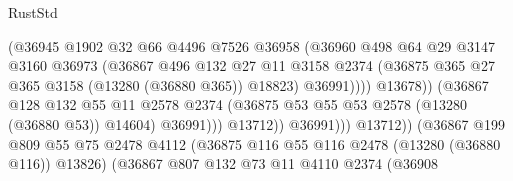\begin{lexlean}{RustStd}
\begin{coremodule}
                                          (@36945
                                            @1902
                                            @32
                                            @66
                                            @4496
                                            @7526
                                            @36958
                                            (@36960
                                              @498
                                              @64
                                              @29
                                              @3147
                                              @3160
                                              @36973
                                              (@36867
                                                @496
                                                @132
                                                @27
                                                @11
                                                @3158
                                                @2374
                                                (@36875
                                                  @365
                                                  @27
                                                  @365
                                                  @3158
                                                  (@13280 (@36880 @365))
                                                  @18823)
                                                @36991))))
                                        @13678))
                                    (@36867
                                      @128
                                      @132
                                      @55
                                      @11
                                      @2578
                                      @2374
                                      (@36875 @53 @55 @53 @2578 (@13280 (@36880 @53)) @14604)
                                      @36991)))
                                @13712))
                            @36991)))
                      @13712))
                  (@36867
                    @199
                    @809
                    @55
                    @75
                    @2478
                    @4112
                    (@36875 @116 @55 @116 @2478 (@13280 (@36880 @116)) @13826)
                    (@36867
                      @807
                      @132
                      @73
                      @11
                      @4110
                      @2374
                      (@36908

\end{coremodule}
\end{lexlean}

